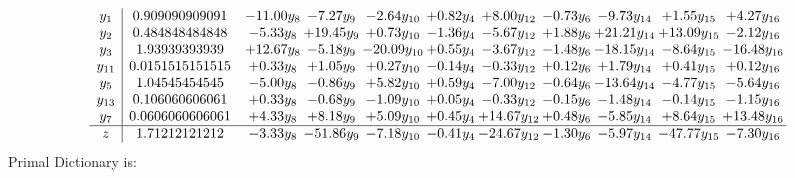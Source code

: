 \documentclass[9pt]{article}
\begin{document}
\[\begin{array}{c| c c@{\hskip 2pt} c@{\hskip 2pt} c@{\hskip 2pt} c@{\hskip 2pt} c@{\hskip 2pt} c@{\hskip 2pt} c@{\hskip 2pt} c@{\hskip 2pt} c@{\hskip 2pt} }
 y_{1}   &  0.909090909091 & -11.00 y_{8} & -7.27 y_{9} & -2.64 y_{10} & +  0.82 y_{4} & +  8.00 y_{12} & -0.73 y_{6} & -9.73 y_{14} & +  1.55 y_{15} & +  4.27 y_{16}\\
 y_{2}   &  0.484848484848 & -5.33 y_{8} & + 19.45 y_{9} & +  0.73 y_{10} & -1.36 y_{4} & -5.67 y_{12} & +  1.88 y_{6} & + 21.21 y_{14} & + 13.09 y_{15} & -2.12 y_{16}\\
 y_{3}   &  1.93939393939 & + 12.67 y_{8} & -5.18 y_{9} & -20.09 y_{10} & +  0.55 y_{4} & -3.67 y_{12} & -1.48 y_{6} & -18.15 y_{14} & -8.64 y_{15} & -16.48 y_{16}\\
 y_{11}   &  0.0151515151515 & +  0.33 y_{8} & +  1.05 y_{9} & +  0.27 y_{10} & -0.14 y_{4} & -0.33 y_{12} & +  0.12 y_{6} & +  1.79 y_{14} & +  0.41 y_{15} & +  0.12 y_{16}\\
 y_{5}   &  1.04545454545 & -5.00 y_{8} & -0.86 y_{9} & +  5.82 y_{10} & +  0.59 y_{4} & -7.00 y_{12} & -0.64 y_{6} & -13.64 y_{14} & -4.77 y_{15} & -5.64 y_{16}\\
 y_{13}   &  0.106060606061 & +  0.33 y_{8} & -0.68 y_{9} & -1.09 y_{10} & +  0.05 y_{4} & -0.33 y_{12} & -0.15 y_{6} & -1.48 y_{14} & -0.14 y_{15} & -1.15 y_{16}\\
 y_{7}   &  0.0606060606061 & +  4.33 y_{8} & +  8.18 y_{9} & +  5.09 y_{10} & +  0.45 y_{4} & + 14.67 y_{12} & +  0.48 y_{6} & -5.85 y_{14} & +  8.64 y_{15} & + 13.48 y_{16}\\
\hline
z    &  1.71212121212 & -3.33 y_{8} & -51.86 y_{9} & -7.18 y_{10} & -0.41 y_{4} & -24.67 y_{12} & -1.30 y_{6} & -5.97 y_{14} & -47.77 y_{15} & -7.30 y_{16}\\
\end{array}\]
Primal Dictionary is:
\end{document}
